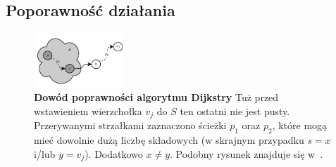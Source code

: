 \subsection{Poporawność działania}



\begin{figure}[!htbp]
	\centering
	\null\hfill
	\includegraphics[width=0.3\textwidth]{Chapter_II/ProofOfDijkstra/a.pdf}
    \hfill\null
	\caption{
		\textbf{Dowód poprawności algorytmu Dijkstry}
		Tuż przed wstawieniem wierzchołka $v_{j}$ do $S$ ten ostatni nie jest pusty.
		Przerywanymi strzałkami zaznaczono ścieżki $p_{1}$ oraz $p_{2}$, które mogą mieć dowolnie dużą liczbę składowych (w skrajnym przypadku $s = x$ i/lub $y = v_{j}$).
		Dodatkowo $x \neq y$.
		Podobny rysunek znajduje się w~\cite[$674$]{Cormen}.
	}
	\label{fig:proofOfDijkstra}
\end{figure}

